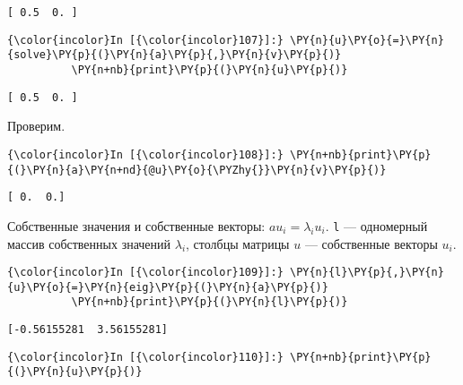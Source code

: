     \begin{Verbatim}[commandchars=\\\{\}]
[ 0.5  0. ]

    \end{Verbatim}

    \begin{Verbatim}[commandchars=\\\{\}]
{\color{incolor}In [{\color{incolor}107}]:} \PY{n}{u}\PY{o}{=}\PY{n}{solve}\PY{p}{(}\PY{n}{a}\PY{p}{,}\PY{n}{v}\PY{p}{)}
          \PY{n+nb}{print}\PY{p}{(}\PY{n}{u}\PY{p}{)}
\end{Verbatim}

    \begin{Verbatim}[commandchars=\\\{\}]
[ 0.5  0. ]

    \end{Verbatim}

    Проверим.

    \begin{Verbatim}[commandchars=\\\{\}]
{\color{incolor}In [{\color{incolor}108}]:} \PY{n+nb}{print}\PY{p}{(}\PY{n}{a}\PY{n+nd}{@u}\PY{o}{\PYZhy{}}\PY{n}{v}\PY{p}{)}
\end{Verbatim}

    \begin{Verbatim}[commandchars=\\\{\}]
[ 0.  0.]

    \end{Verbatim}

    Собственные значения и собственные векторы: \(a u_i = \lambda_i u_i\).
\texttt{l} --- одномерный массив собственных значений \(\lambda_i\),
столбцы матрицы \(u\) --- собственные векторы \(u_i\).

    \begin{Verbatim}[commandchars=\\\{\}]
{\color{incolor}In [{\color{incolor}109}]:} \PY{n}{l}\PY{p}{,}\PY{n}{u}\PY{o}{=}\PY{n}{eig}\PY{p}{(}\PY{n}{a}\PY{p}{)}
          \PY{n+nb}{print}\PY{p}{(}\PY{n}{l}\PY{p}{)}
\end{Verbatim}

    \begin{Verbatim}[commandchars=\\\{\}]
[-0.56155281  3.56155281]

    \end{Verbatim}

    \begin{Verbatim}[commandchars=\\\{\}]
{\color{incolor}In [{\color{incolor}110}]:} \PY{n+nb}{print}\PY{p}{(}\PY{n}{u}\PY{p}{)}
\end{Verbatim}

